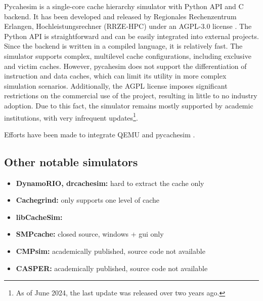 Pycahesim is a single-core cache hierarchy simulator with Python API and C backend. It has been developed and released by Regionales Rechenzentrum Erlangen, Hochleistungsrechner (RRZE-HPC)
under an AGPL-3.0 license \cite{pycachesim}. The Python API is straightforward and can be easily integrated into external projects. Since the backend is written in a compiled language, it is
relatively fast. The simulator supports complex, multilevel cache configurations, including exclusive and victim caches. %
However, pycahesim does not support the differentiation of instruction and data caches, which can limit its utility in more complex simulation scenarios. Additionally, the AGPL
license imposes significant restrictions on the commercial use of the project, resulting in little to no industry adoption. Due to this fact, the simulator remains mostly supported
by academic institutions, with very infrequent updates\footnote{As of June 2024, the last update was released over two years ago.}.

\vspace{10px}
\noindent Efforts have been made to integrate QEMU and pycachesim \cite{pycachesimqemu}.

\subsection{Other notable simulators}
\begin{itemize}
	\item \textbf{DynamoRIO, drcachesim:} hard to extract the cache only
	\item \textbf{Cachegrind:} only supports one level of cache
	\item \textbf{libCacheSim:}
	\item \textbf{SMPcache:} closed source, windows + gui only
	\item \textbf{CMPsim:} academically published, source code not available
	\item \textbf{CASPER:} academically published, source code not available
\end{itemize}
